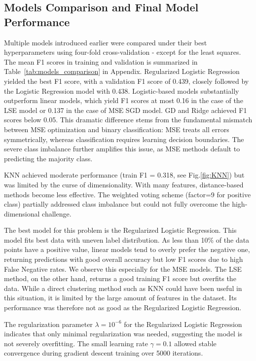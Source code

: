 \documentclass[10pt,conference,compsocconf]{IEEEtran}
\begin{document}
\subsection{Models Comparison and Final Model Performance}
Multiple models introduced earlier were compared under their best hyperparameters using four-fold cross-validation - except for the least squares. The mean F1 scores in training and validation is  summarized in Table~\ref{tab:models_comparison} in Appendix.  Regularized Logistic Regression yielded the best F1 score, with a validation F1 score of 0.439, closely followed by the Logistic Regression model with 0.438.  Logistic-based models substantially outperform linear models, which yield F1 scores at most 0.16 in the case of the LSE model or 0.137 in the case of MSE SGD model. 
GD and Ridge achieved F1 scores below 0.05. This dramatic difference stems from the fundamental mismatch between MSE optimization and binary classification: MSE treats all errors symmetrically, whereas classification requires learning decision boundaries. The severe class imbalance further amplifies this issue, as MSE methods default to predicting the majority class.

KNN achieved moderate performance (train F1 = 0.318, see Fig.\ref{fig:KNN}) but was limited by the curse of dimensionality. With many features, distance-based methods become less effective. The weighted voting scheme (factor=9 for positive class) partially addressed class imbalance but could not fully overcome the high-dimensional challenge.

The best model for this problem is the Regularized Logistic Regression. This model fits best data with uneven label distribution. As less than 10\% of the data points have a positive value, linear models tend to overly prefer the negative one, returning predictions with good overall accuracy but low F1 scores due to high False Negative rates. We observe this especially for the MSE models. The LSE method, on the other hand, returns a good training F1 score but overfits the data. While a direct clustering method such as KNN could have been useful in this situation, it is limited by the large amount of features in the dataset. Its performance was therefore not as good as the Regularized Logistic Regression.

The regularization parameter $\lambda=10^{-6}$ for the Regularized Logistic Regression indicates that only minimal regularization was needed, suggesting the model is not severely overfitting. The small learning rate $\gamma=0.1$ allowed stable convergence during gradient descent training over 5000 iterations.
\end{document}
